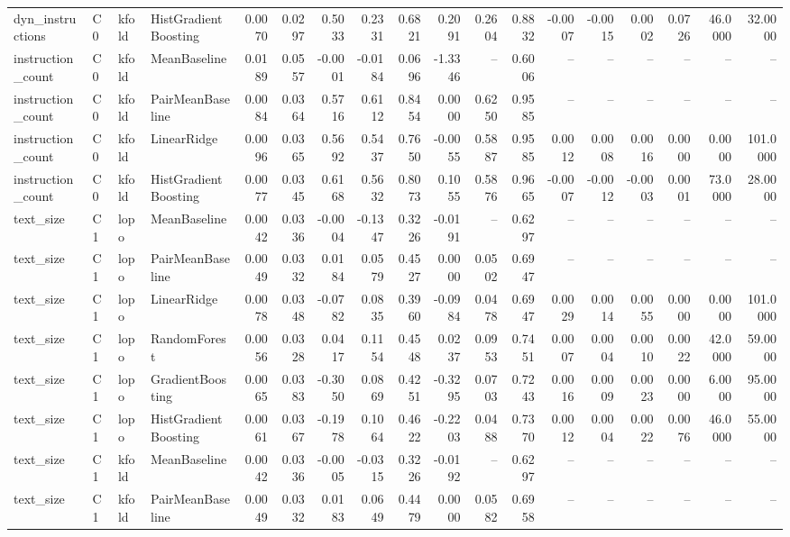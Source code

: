 \begin{table}[t]
\begin{tabular}{llllrrrrrrrrrrrrrr}
dyn\_instructions & C0 & kfold & HistGradientBoosting & 0.0070 & 0.0297 & 0.5033 & 0.2331 & 0.6821 & 0.2091 & 0.2604 & 0.8832 & -0.0007 & -0.0015 & 0.0002 & 0.0726 & 46.0000 & 32.0000 \\
instruction\_count & C0 & kfold & MeanBaseline & 0.0189 & 0.0557 & -0.0001 & -0.0184 & 0.0696 & -1.3346 & -- & 0.6006 & -- & -- & -- & -- & -- & -- \\
instruction\_count & C0 & kfold & PairMeanBaseline & 0.0084 & 0.0364 & 0.5716 & 0.6112 & 0.8454 & 0.0000 & 0.6250 & 0.9585 & -- & -- & -- & -- & -- & -- \\
instruction\_count & C0 & kfold & LinearRidge & 0.0096 & 0.0365 & 0.5692 & 0.5437 & 0.7650 & -0.0055 & 0.5887 & 0.9585 & 0.0012 & 0.0008 & 0.0016 & 0.0000 & 0.0000 & 101.0000 \\
instruction\_count & C0 & kfold & HistGradientBoosting & 0.0077 & 0.0345 & 0.6168 & 0.5632 & 0.8073 & 0.1055 & 0.5876 & 0.9665 & -0.0007 & -0.0012 & -0.0003 & 0.0001 & 73.0000 & 28.0000 \\
text\_size & C1 & lopo & MeanBaseline & 0.0042 & 0.0336 & -0.0004 & -0.1347 & 0.3226 & -0.0191 & -- & 0.6297 & -- & -- & -- & -- & -- & -- \\
text\_size & C1 & lopo & PairMeanBaseline & 0.0049 & 0.0332 & 0.0184 & 0.0579 & 0.4527 & 0.0000 & 0.0502 & 0.6947 & -- & -- & -- & -- & -- & -- \\
text\_size & C1 & lopo & LinearRidge & 0.0078 & 0.0348 & -0.0782 & 0.0835 & 0.3960 & -0.0984 & 0.0478 & 0.6947 & 0.0029 & 0.0014 & 0.0055 & 0.0000 & 0.0000 & 101.0000 \\
text\_size & C1 & lopo & RandomForest & 0.0056 & 0.0328 & 0.0417 & 0.1154 & 0.4548 & 0.0237 & 0.0953 & 0.7451 & 0.0007 & 0.0004 & 0.0010 & 0.0022 & 42.0000 & 59.0000 \\
text\_size & C1 & lopo & GradientBoosting & 0.0065 & 0.0383 & -0.3050 & 0.0869 & 0.4251 & -0.3295 & 0.0703 & 0.7243 & 0.0016 & 0.0009 & 0.0023 & 0.0000 & 6.0000 & 95.0000 \\
text\_size & C1 & lopo & HistGradientBoosting & 0.0061 & 0.0367 & -0.1978 & 0.1064 & 0.4622 & -0.2203 & 0.0488 & 0.7370 & 0.0012 & 0.0004 & 0.0022 & 0.0076 & 46.0000 & 55.0000 \\
text\_size & C1 & kfold & MeanBaseline & 0.0042 & 0.0336 & -0.0005 & -0.0315 & 0.3226 & -0.0192 & -- & 0.6297 & -- & -- & -- & -- & -- & -- \\
text\_size & C1 & kfold & PairMeanBaseline & 0.0049 & 0.0332 & 0.0183 & 0.0649 & 0.4479 & 0.0000 & 0.0582 & 0.6958 & -- & -- & -- & -- & -- & -- \\

\end{tabular}
\end{table}
